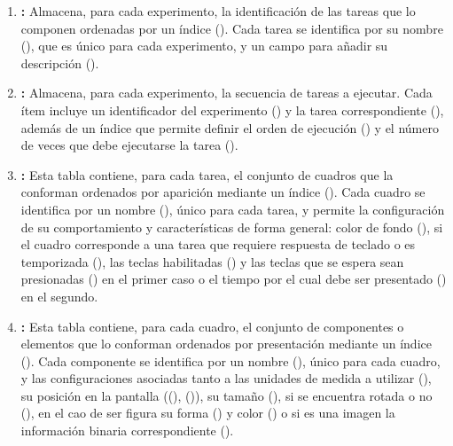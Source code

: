 \documentclass[\main/Main.tex]{subfiles}
\begin{document}
\begin{enumerate}
				\item \textbf{:} Almacena, para cada experimento, la identificación de las tareas que lo componen ordenadas por un índice (). Cada tarea se identifica por su nombre (), que es único para cada experimento, y un campo para añadir su descripción ().

				\item \textbf{:} Almacena, para cada experimento, la secuencia de tareas a ejecutar. Cada ítem incluye un identificador del experimento () y la tarea correspondiente (), además de un índice que permite definir el orden de ejecución () y el número de veces que debe ejecutarse la tarea (). 

				\item \textbf{:} Esta tabla contiene, para cada tarea, el conjunto de cuadros que la conforman ordenados por aparición mediante un índice (). Cada cuadro se identifica por un nombre (),  único para cada tarea, y permite la configuración de su comportamiento y características de forma general: color de fondo (), si el cuadro corresponde a una tarea que requiere respuesta de teclado o es temporizada (), las teclas habilitadas () y las teclas que se espera sean presionadas () en el primer caso o el tiempo por el cual debe ser presentado () en el segundo.

				\item \textbf{:} Esta tabla contiene, para cada cuadro, el conjunto de componentes o elementos que lo conforman ordenados por presentación mediante un índice (). Cada componente se identifica por un nombre (), único para cada cuadro, y las configuraciones asociadas tanto a las unidades de medida a utilizar (), su posición en la pantalla ((), ()), su tamaño (), si se encuentra rotada o no (), en el cao de ser figura su forma () y color () o si es una imagen la información binaria correspondiente (). 
			\end{enumerate}
\end{document}
